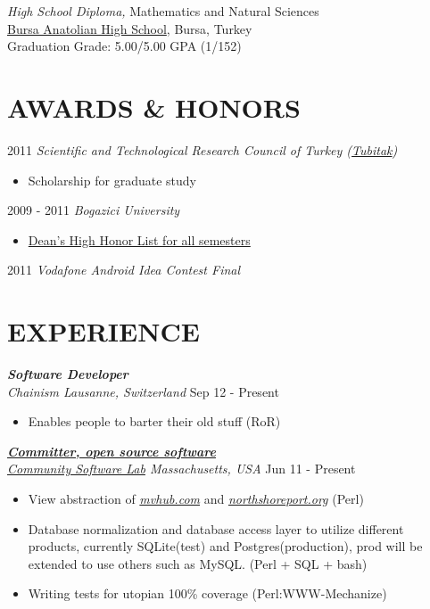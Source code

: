 \documentclass[line, margin]{res}
\begin{document}
\begin{resume}
	{\sl High School Diploma,} Mathematics and Natural Sciences \\
	\href{http://www.bursaanadolulisesi.k12.tr/}{Bursa Anatolian High School}, Bursa, Turkey \\
	Graduation Grade: 5.00/5.00 GPA (1/152)               

\section{AWARDS \& HONORS}
	2011 {\sl Scientific and Technological Research Council of Turkey 						(\href{http://www.tubitak.gov.tr/en/ot/10/}{Tubitak})} \\
	\vspace{-.3cm}				
	\begin{itemize} 
		\item Scholarship for graduate study
	\end{itemize}
				
	2009 - 2011 {\sl Bogazici University }
	\begin{itemize} \itemsep -2pt
		\item \href{http://www.eng.boun.edu.tr/current_students.html}{Dean's High Honor List for all semesters}	
	\end{itemize}

	2011 {\sl Vodafone Android Idea Contest Final} \\
 
\section{EXPERIENCE}
	{\sl \textbf{Software Developer} \\
	Chainism Lausanne, Switzerland } \hfill Sep 12 - Present 
	\vspace{-0.3cm} \\
	\begin{itemize} \itemsep -2pt
		\item Enables people to barter their old stuff (RoR)
	\end{itemize}
 
	{\sl \textbf{\href{https://launchpad.net/mvhub}{Committer, open source software}} \\ \href{http://thecsl.org/}{Community Software Lab} Massachusetts, USA} \hfill Jun 11 - Present \\
	\vspace{-0.3cm}
	\begin{itemize} \itemsep -2pt
		\item View abstraction of \textit{\href{http://mvhub.com/}{mvhub.com}} and \textit{\href{http://northshoreport.org/}{northshoreport.org}} (Perl)
		\item Database normalization and database access layer to utilize different products, currently SQLite(test) and Postgres(production), prod will be extended to use others such as MySQL. (Perl + SQL + bash)
		\item Writing tests for utopian 100\% coverage (Perl:WWW-Mechanize)
	\end{itemize}


\end{resume}
\end{document}
